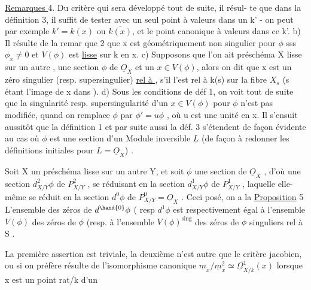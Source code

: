 
\uline{Remarques }4.  Du  critère qui sera développé tout de suite, il résul-%
te que dans la définition 3, il suffit de tester avec un seul point
à valeurs dans un k' - on peut par exemple  $k'=k(x)$ ou $\overline{k(x)}$, et
le point canonique à valeurs dans ce k'. b) Il résulte de la remar
que 2 que x est géométriquement non singulier pour $\phi$ sss $\phi_x \neq 0$ et
$V(\phi)$ est \uline{lisse} sur k en x. c) Supposons que l'on ait  préschéma X lisse
sur un autre , une section $\phi$ de $\underline{O}_X$ et un $x \in V(\phi)$, alors on dit que x
est un zéro singulier (resp. supersingulier) \uline{rel à }, s'il l'est
rel à k(s) sur la fibre $X_s$ (s étant l'image de x dans ). d) Sous
les conditions de déf 1, on voit tout de suite que la singularité resp.
\margin{$\|$} supersingularité d'un $x \in V(\phi)$ pour $\phi$ n'est pas modifiée, quand on
remplace $\phi$ par $\phi'=u\phi$ , où u est une unité en x. Il s'ensuit aussitôt que
la  définition 1 et par suite aussi la déf. 3 s'étendent de façon
évidente au cas où $\phi$ est une section d'un Module inversible $\underline{L}$ (de façon
à redonner les définitions initiales pour $L = \underline{O}_X$) .

 Soit X un préschéma lisse sur un
autre Y, et soit $\phi$ une section de $\underline{O}_X$ , d'où une section $d^2_{X/Y}\phi$ de
$P^2_{X/Y}$ , se réduisant en la section $d^1_{X/Y}\phi$ de $P^1_{X/Y}$ , laquelle elle-même
se réduit en la section $d^0\phi$ \inserted[typed]{$=\phi$} de $P^0_{X/Y} = \underline{O}_X$ . Ceci posé, on a la
\uline{Proposition} 5 L'ensemble des zéros de $d^{\hand{0}}\phi$ ( resp $d^1\phi$ \hand{)} 
 est respectivement égal à l'ensemble $V(\phi)$ des zéros de $\phi$ (resp. à
l'ensemble $V(\phi)^{\mathrm{sing}}$ des zéros de $\phi$ singuliers rel à S\hand{)} 
.

La première assertion est triviale, la deuxième n'est autre
que le critère jacobien, ou si on préfère résulte de l'isomorphisme
canonique $\underline{m}_x/\underline{m}_x^2 \simeq \underline{\Omega}^1_{X/k}(x)$ lorsque x est un point rat/k d'un

